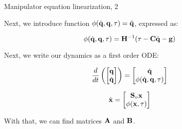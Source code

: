\documentclass{beamer}
\begin{document}
\begin{frame}{Manipulator equation linearization, 2}
	\begin{flushleft}
		
		Next, we introduce function $\phi(\dot{\mathbf{q}}, \mathbf{q}, \tau) = \ddot{\mathbf{q}}$, expressed as:
		
		\begin{equation}
			\phi(\dot{\mathbf{q}}, \mathbf{q}, \tau) 
			=
			\mathbf{H}^{-1} (\tau - \mathbf{C} \dot{\mathbf{q}} - \mathbf{g} ) 
		\end{equation}
		
		Next, we write our dynamics as a first order ODE:
		
		\begin{equation}
			\frac{d}{dt} 
			\left(
			\begin{bmatrix}
				\mathbf{q} \\ \dot{\mathbf{q}} 
			\end{bmatrix}
			\right)
			=
			\begin{bmatrix}
				\dot{\mathbf{q}}  \\ 
				\phi(\dot{\mathbf{q}}, \mathbf{q}, \tau) 
			\end{bmatrix}
		\end{equation}
	
	\begin{equation}
	\dot{\mathbf{x}} 
	=
	\begin{bmatrix}
		\mathbf{S}_v \mathbf{x}  \\ 
		\phi(\mathbf{x}, \tau) 
	\end{bmatrix}
\end{equation}
		
		With that, we can find matrices $\mathbf{A}$ and $\mathbf{B}$.
		
	\end{flushleft}
\end{frame}
\end{document}
